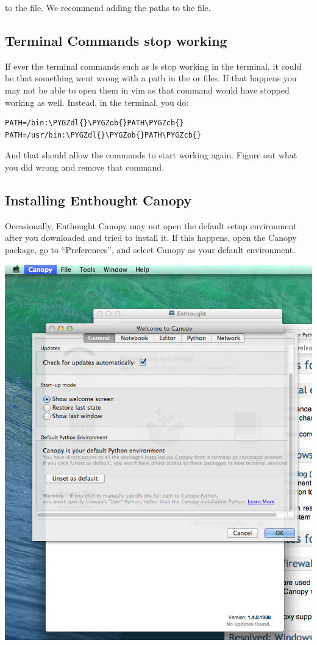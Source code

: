 \documentclass[letterpaper,10pt,english]{sphinxmanual}
\def\PYGZob{\char`\{}
\def\PYGZcb{\char`\}}
\def\PYGZdl{\char`\$}
\begin{document}
to the  file. We recommend adding the paths to the  file.


\subsection{Terminal Commands stop working}
\label{docfiles/install_dependencies:terminal-commands-stop-working}
If ever the terminal commands such as ls stop working in the terminal, it could be that something went wrong with a path in the  or  files. If that happens you may not be able to open them in vim as that command would have stopped working as well. Instead, in the terminal, you do:

\begin{Verbatim}[commandchars=\\\{\}]
PATH=/bin:\PYGZdl{}\PYGZob{}PATH\PYGZcb{}
PATH=/usr/bin:\PYGZdl{}\PYGZob{}PATH\PYGZcb{}
\end{Verbatim}

And that should allow the commands to start working again. Figure out what you did wrong and remove that command.


\subsection{Installing Enthought Canopy}
\label{docfiles/install_dependencies:installing-enthought-canopy}
Occasionally, Enthought Canopy may not open the default setup environment after you downloaded and tried to install it. If this happens, open the Canopy package, go to ``Preferences'', and select Canopy as your default environment.

\includegraphics{enthought_as_default.png}
\end{document}
